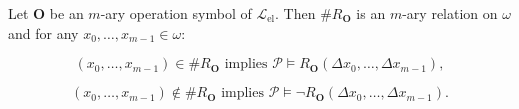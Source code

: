 Let $\mathbf{O}$ be an $m$-ary operation symbol of $\mathcal{L}_{\text{el}}$. Then $\#R_{\mathbf{O}}$ is an $m$-ary relation on $\omega$ and for any $x_0, \ldots, x_{m-1} \in \omega$:

$$(x_0, \ldots, x_{m-1}) \in \#R_{\mathbf{O}} \text{ implies } \mathcal{P} \models R_{\mathbf{O}}(\Delta x_0, \ldots, \Delta x_{m-1}),$$

$$(x_0, \ldots, x_{m-1}) \notin \#R_{\mathbf{O}} \text{ implies } \mathcal{P} \models \neg R_{\mathbf{O}}(\Delta x_0, \ldots, \Delta x_{m-1}).$$
